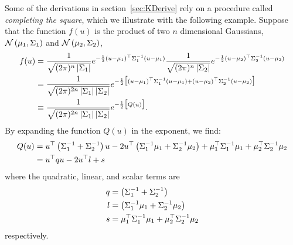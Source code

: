 Some of the derivations in section~\ref{sec:KDerive} rely on a
procedure called \emph{completing the square}, which we illustrate
with the following example.  Suppose that the function $f(u)$ is the
product of two $n$ dimensional Gaussians,
${\mathcal{N}}\left(\mu_1,\Sigma_1\right)$ and
${\mathcal{N}}\left(\mu_2,\Sigma_2\right)$, \ie
\begin{align}
  \label{eq:Qu.a}
  f(u) &= \frac{1} {\sqrt{(2\pi)^n \left| \Sigma_1 \right| }}
  e^{-\frac{1}{2} ( u - \mu_1)^\top \Sigma_1^{-1} ( u - \mu_1)}
  \frac{1} {\sqrt{(2\pi)^n \left| \Sigma_2 \right| }}
  e^{-\frac{1}{2} ( u - \mu_2)^\top \Sigma_2^{-1} ( u - \mu_2)}\\
  \nonumber
       &= \frac{1} {\sqrt{(2\pi)^{2n} \left| \Sigma_1 \right| \left|
        \Sigma_2 \right| }} e^{-\frac{1}{2}\big[ ( u -
    \mu_1)^\top \Sigma_1^{-1} ( u - \mu_1) + ( u -
    \mu_2)^\top \Sigma_2^{-1} ( u - \mu_2)\big]}\\
  \nonumber
  &\equiv \frac{1} {\sqrt{(2\pi)^{2n} \left| \Sigma_1 \right| \left|
        \Sigma_2 \right| }} e^{-\frac{1}{2}\big[Q(u)\big]}.
\end{align}
By expanding the function $Q(u)$ in the exponent, we find:
\begin{align}
  \nonumber
  Q(u) &= u^\top \left( \Sigma_1^{-1} + \Sigma_2^{-1} \right) u -
  2 u^\top  \left( \Sigma_1^{-1} \mu_1 + \Sigma_2^{-1} \mu_2
  \right) + \mu_1^\top \Sigma_1^{-1} \mu_1 + \mu_2^\top
  \Sigma_2^{-1} \mu_2 \\
  \label{eq:Qu.e}
  &= u^\top q u - 2 u^\top l + s
\end{align}
where the quadratic, linear, and scalar terms are
\begin{align*}
  q &= \left( \Sigma_1^{-1} + \Sigma_2^{-1} \right) \\
  l &= \left( \Sigma_1^{-1} \mu_1 + \Sigma_2^{-1} \mu_2 \right) \\
  s &= \mu_1^\top \Sigma_1^{-1} \mu_1 + \mu_2^\top
  \Sigma_2^{-1} \mu_2
\end{align*}
respectively.

